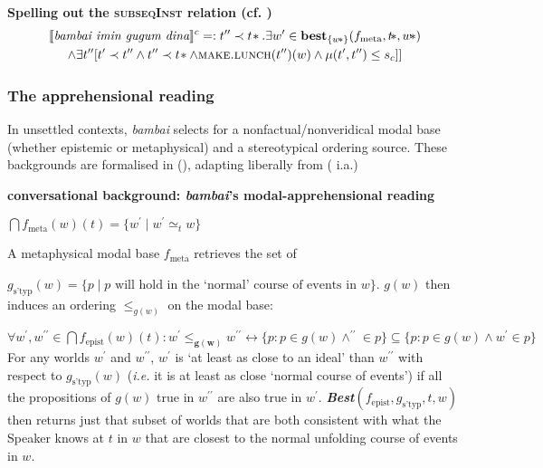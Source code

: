 \documentclass[11pt]{article}
\providecommand{\denote}[2][]{\ensuremath{\llbracket{#2}\rrbracket^{#1}}}
\newcommand{\mcom}[1]
{\marginpar{\color{white}\raggedleft\raggedright\hspace{0pt}\linespread{0.9}\footnotesize{#1}}}
\begin{document}
\a \textbf{Spelling out the \textsc{subseqInst} relation (cf. )}
\begin{multline*}\denote[c]{\textit{bambai imin gugum dina}}=:t''\prec t\!*.\exists w'\in\textbf{best}_{\{w\!*\}}(f_{\text{meta}},t\!*,w\!*)\\\wedge\exists t''[t'\prec t''\wedge t''\prec t\!*\wedge\textsc{make.lunch}(t'')(w)\wedge\mu(t',t'')\leq s_c]]\end{multline*}
\xe


\subsubsection{The apprehensional reading}

In unsettled contexts, \textit{bambai} selects for a nonfactual/nonveridical modal base (whether epistemic or metaphysical) and a stereotypical ordering source. These backgrounds are formalised in (\nextx), adapting liberally from (\citealt[37-40]{Kratzer2012} i.a.)

\pex\textbf{conversational background: \textit{bambai}'s modal-apprehensional reading}

\a $\bigcap f_\text{meta}(w)(t)=\{w^\prime\mid w^\prime\simeq_t w\}$

A metaphysical modal base $ f_{\text{meta}} $ retrieves the set of

\a $g_\text{s'typ}(w)=\{p\mid p\text{ will hold in the `normal' course of events in }w\}$.
\a$g(w)$ then induces an ordering $\leqslant_{g(w)}$ on the modal base:

\hspace{-.45cm}$\forall w^\prime,w^{\prime\prime}\in\bigcap f_\text{epist}(w)(t):w^\prime\boldsymbol{\leqslant_{g(w)}}w^{\prime\prime}\leftrightarrow\{p:p\in g(w)\wedge ^{\prime\prime}\in p\}\subseteq\{p:p\in g(w)\wedge w^\prime\in p\}$
\hspace{.35cm}
For any worlds $w^\prime$ and $w^{\prime\prime}$, $w^\prime$ is `at least as close to an ideal' than $w^{\prime\prime}$ with respect to $g_\text{s'typ}(w)$ (\textit{i.e.} it is at least as close `normal course of events') if all the propositions of $g(w)$ true in $w^{\prime\prime}$ are also true in $w^\prime$.
\a \textbf{\textit{Best}}$(f_\text{epist},g_\text{s'typ},t,w)$ then returns just that subset of worlds that are both consistent with what the Speaker knows at $t$ in $w$ that are closest to the normal unfolding course of events in $w$.
\xe
\end{document}
